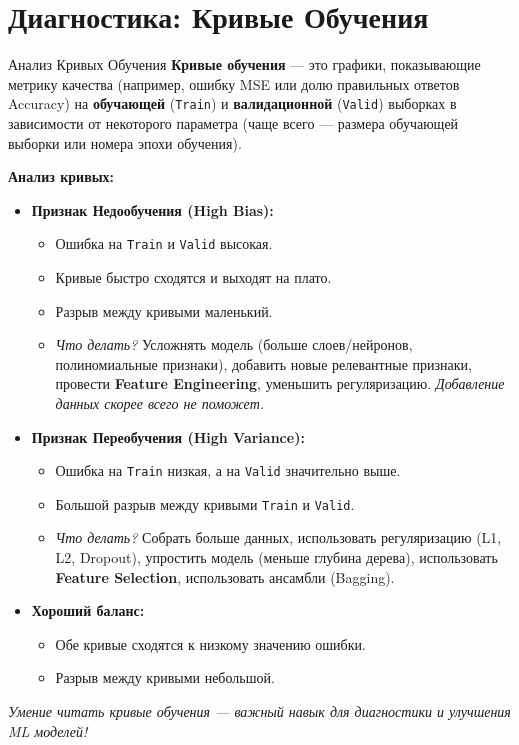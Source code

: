     \section{Диагностика: Кривые Обучения}
    
    \begin{myexampleblock}{Анализ Кривых Обучения}
    \textbf{Кривые обучения} — это графики, показывающие метрику качества (например, ошибку MSE или долю правильных ответов Accuracy) на \textbf{обучающей} (\texttt{Train}) и \textbf{валидационной} (\texttt{Valid}) выборках в зависимости от некоторого параметра (чаще всего — размера обучающей выборки или номера эпохи обучения).
    
    \textbf{Анализ кривых:}
    \begin{itemize}
        \item \textbf{Признак Недообучения (High Bias):}
            \begin{itemize}
                \item Ошибка на \texttt{Train} и \texttt{Valid} высокая.
                \item Кривые быстро сходятся и выходят на плато.
                \item Разрыв между кривыми маленький.
                \item \textit{Что делать?} Усложнять модель (больше слоев/нейронов, полиномиальные признаки), добавить новые релевантные признаки, провести \textbf{Feature Engineering}, уменьшить регуляризацию. \textit{Добавление данных скорее всего не поможет.}
            \end{itemize}
        \item \textbf{Признак Переобучения (High Variance):}
            \begin{itemize}
                \item Ошибка на \texttt{Train} низкая, а на \texttt{Valid} значительно выше.
                \item Большой разрыв между кривыми \texttt{Train} и \texttt{Valid}.
                \item \textit{Что делать?} Собрать больше данных, использовать регуляризацию (L1, L2, Dropout), упростить модель (меньше глубина дерева), использовать \textbf{Feature Selection}, использовать ансамбли (Bagging).
            \end{itemize}
        \item \textbf{Хороший баланс:}
            \begin{itemize}
                \item Обе кривые сходятся к низкому значению ошибки.
                \item Разрыв между кривыми небольшой.
            \end{itemize}
    \end{itemize}
    \textit{Умение читать кривые обучения — важный навык для диагностики и улучшения ML моделей!}
    \end{myexampleblock}
    
